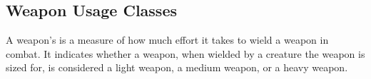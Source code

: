    \subsection{Weapon Usage Classes}\label{Weapon Usage Classes}
        A weapon's  is a measure of how much effort it takes to wield a weapon in combat.
        It indicates whether a weapon, when wielded by a creature the weapon is sized for, is considered a light weapon, a medium weapon, or a heavy weapon.





